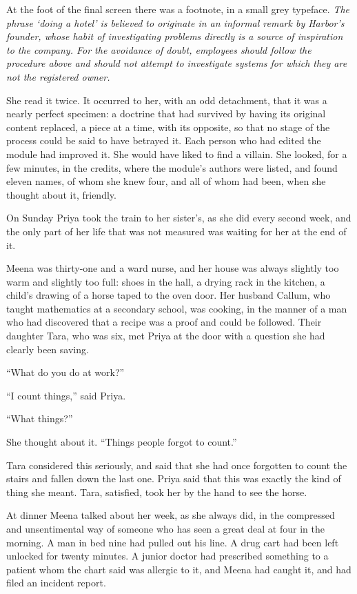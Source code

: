 At the foot of the final screen there was a footnote, in a small grey typeface. \emph{The phrase `doing a hotel' is believed to originate in an informal remark by Harbor's founder, whose habit of investigating problems directly is a source of inspiration to the company. For the avoidance of doubt, employees should follow the procedure above and should not attempt to investigate systems for which they are not the registered owner.}

She read it twice. It occurred to her, with an odd detachment, that it was a nearly perfect specimen: a doctrine that had survived by having its original content replaced, a piece at a time, with its opposite, so that no stage of the process could be said to have betrayed it. Each person who had edited the module had improved it. She would have liked to find a villain. She looked, for a few minutes, in the credits, where the module's authors were listed, and found eleven names, of whom she knew four, and all of whom had been, when she thought about it, friendly.

\scenebreak
\noindent On Sunday Priya took the train to her sister's, as she did every second week, and the only part of her life that was not measured was waiting for her at the end of it.

Meena was thirty-one and a ward nurse, and her house was always slightly too warm and slightly too full: shoes in the hall, a drying rack in the kitchen, a child's drawing of a horse taped to the oven door. Her husband Callum, who taught mathematics at a secondary school, was cooking, in the manner of a man who had discovered that a recipe was a proof and could be followed. Their daughter Tara, who was six, met Priya at the door with a question she had clearly been saving.

``What do you do at work?''

``I count things,'' said Priya.

``What things?''

She thought about it. ``Things people forgot to count.''

Tara considered this seriously, and said that she had once forgotten to count the stairs and fallen down the last one. Priya said that this was exactly the kind of thing she meant. Tara, satisfied, took her by the hand to see the horse.

At dinner Meena talked about her week, as she always did, in the compressed and unsentimental way of someone who has seen a great deal at four in the morning. A man in bed nine had pulled out his line. A drug cart had been left unlocked for twenty minutes. A junior doctor had prescribed something to a patient whom the chart said was allergic to it, and Meena had caught it, and had filed an incident report.

